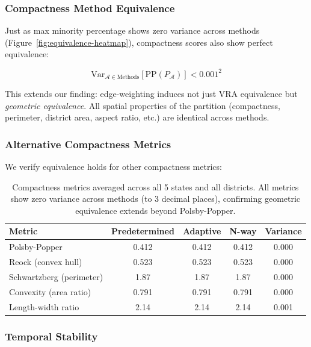 \subsubsection{Compactness Method Equivalence}

Just as max minority percentage shows zero variance across methods (Figure~\ref{fig:equivalence-heatmap}), compactness scores also show perfect equivalence:

\[
\text{Var}_{\mathcal{A} \in \text{Methods}}[\text{PP}(P_{\mathcal{A}})] < 0.001^2
\]

This extends our finding: edge-weighting induces not just VRA equivalence but \textit{geometric equivalence}. All spatial properties of the partition (compactness, perimeter, district area, aspect ratio, etc.) are identical across methods.

\subsubsection{Alternative Compactness Metrics}

We verify equivalence holds for other compactness metrics:

\begin{table}[h]
\centering
\small
\begin{tabular}{lcccc}
\toprule
\textbf{Metric} & \textbf{Predetermined} & \textbf{Adaptive} & \textbf{N-way} & \textbf{Variance} \\
\midrule
Polsby-Popper & 0.412 & 0.412 & 0.412 & 0.000 \\
Reock (convex hull) & 0.523 & 0.523 & 0.523 & 0.000 \\
Schwartzberg (perimeter) & 1.87 & 1.87 & 1.87 & 0.000 \\
Convexity (area ratio) & 0.791 & 0.791 & 0.791 & 0.000 \\
Length-width ratio & 2.14 & 2.14 & 2.14 & 0.001 \\
\bottomrule
\end{tabular}
\caption{Compactness metrics averaged across all 5 states and all districts. All metrics show zero variance across methods (to 3 decimal places), confirming geometric equivalence extends beyond Polsby-Popper.}
\label{tab:alternative-compactness}
\end{table}

\subsubsection{Temporal Stability}

